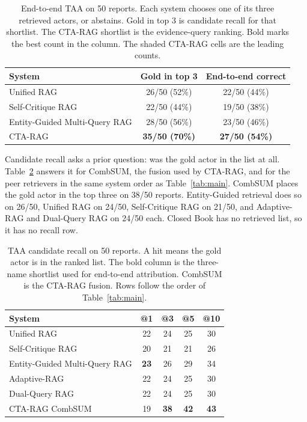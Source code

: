 \documentclass[5p,times,authoryear]{elsarticle}
\begin{document}
\begin{table}[t]
\centering
\small
\caption{End-to-end TAA on 50 reports. Each system chooses one of its three retrieved actors, or abstains. Gold in top 3 is candidate recall for that shortlist. The CTA-RAG shortlist is the evidence-query ranking. Bold marks the best count in the column. The shaded CTA-RAG cells are the leading counts.}
\label{tab:taa-main}
\begin{tabular}{@{}lcc@{}}
\toprule
System & Gold in top 3 & End-to-end correct \\
\midrule
Unified RAG                    & 26/50 (52\%) & 22/50 (44\%) \\
Self-Critique RAG              & 22/50 (44\%) & 19/50 (38\%) \\
Entity-Guided Multi-Query RAG  & 28/50 (56\%) & 23/50 (46\%) \\
CTA-RAG                        & \cellcolor{ctagood}\textbf{35/50 (70\%)} & \cellcolor{ctagood}\textbf{27/50 (54\%)} \\
\bottomrule
\end{tabular}
\end{table}

Candidate recall asks a prior question: was the gold actor in the list at all. Table~\ref{tab:taa-retrieval} answers it for CombSUM, the fusion used by CTA-RAG, and for the peer retrievers in the same system order as Table~\ref{tab:main}. CombSUM places the gold actor in the top three on 38/50 reports. Entity-Guided retrieval does so on 26/50, Unified RAG on 24/50, Self-Critique RAG on 21/50, and Adaptive-RAG and Dual-Query RAG on 24/50 each. Closed Book has no retrieved list, so it has no recall row.

\begin{table}[t]
\centering
\small
\caption{TAA candidate recall on 50 reports. A hit means the gold actor is in the ranked list. The bold column is the three-name shortlist used for end-to-end attribution. CombSUM is the CTA-RAG fusion. Rows follow the order of Table~\ref{tab:main}.}
\label{tab:taa-retrieval}
\begin{tabular}{@{}lcccc@{}}
\toprule
System & @1 & \textbf{@3} & @5 & @10 \\
\midrule
Unified RAG & 22 & 24 & 25 & 30 \\
Self-Critique RAG & 20 & 21 & 21 & 26 \\
Entity-Guided Multi-Query RAG & \textbf{23} & 26 & 29 & 34 \\
Adaptive-RAG & 22 & 24 & 25 & 30 \\
Dual-Query RAG & 22 & 24 & 25 & 30 \\
CTA-RAG CombSUM & 19 & \cellcolor{ctagood}\textbf{38} & \cellcolor{ctagood}\textbf{42} & \cellcolor{ctagood}\textbf{43} \\
\bottomrule
\end{tabular}
\end{table}
\end{document}
